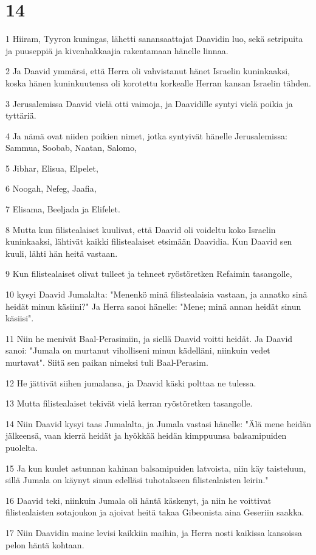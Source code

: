 \chapter{14}

\par 1 Hiiram, Tyyron kuningas, lähetti sanansaattajat Daavidin luo, sekä setripuita ja puuseppiä ja kivenhakkaajia rakentamaan hänelle linnaa.
\par 2 Ja Daavid ymmärsi, että Herra oli vahvistanut hänet Israelin kuninkaaksi, koska hänen kuninkuutensa oli korotettu korkealle Herran kansan Israelin tähden.
\par 3 Jerusalemissa Daavid vielä otti vaimoja, ja Daavidille syntyi vielä poikia ja tyttäriä.
\par 4 Ja nämä ovat niiden poikien nimet, jotka syntyivät hänelle Jerusalemissa: Sammua, Soobab, Naatan, Salomo,
\par 5 Jibhar, Elisua, Elpelet,
\par 6 Noogah, Nefeg, Jaafia,
\par 7 Elisama, Beeljada ja Elifelet.
\par 8 Mutta kun filistealaiset kuulivat, että Daavid oli voideltu koko Israelin kuninkaaksi, lähtivät kaikki filistealaiset etsimään Daavidia. Kun Daavid sen kuuli, lähti hän heitä vastaan.
\par 9 Kun filistealaiset olivat tulleet ja tehneet ryöstöretken Refaimin tasangolle,
\par 10 kysyi Daavid Jumalalta: "Menenkö minä filistealaisia vastaan, ja annatko sinä heidät minun käsiini?" Ja Herra sanoi hänelle: "Mene; minä annan heidät sinun käsiisi".
\par 11 Niin he menivät Baal-Perasimiin, ja siellä Daavid voitti heidät. Ja Daavid sanoi: "Jumala on murtanut viholliseni minun kädelläni, niinkuin vedet murtavat". Siitä sen paikan nimeksi tuli Baal-Perasim.
\par 12 He jättivät siihen jumalansa, ja Daavid käski polttaa ne tulessa.
\par 13 Mutta filistealaiset tekivät vielä kerran ryöstöretken tasangolle.
\par 14 Niin Daavid kysyi taas Jumalalta, ja Jumala vastasi hänelle: "Älä mene heidän jälkeensä, vaan kierrä heidät ja hyökkää heidän kimppuunsa balsamipuiden puolelta.
\par 15 Ja kun kuulet astunnan kahinan balsamipuiden latvoista, niin käy taisteluun, sillä Jumala on käynyt sinun edelläsi tuhotakseen filistealaisten leirin."
\par 16 Daavid teki, niinkuin Jumala oli häntä käskenyt, ja niin he voittivat filistealaisten sotajoukon ja ajoivat heitä takaa Gibeonista aina Geseriin saakka.
\par 17 Niin Daavidin maine levisi kaikkiin maihin, ja Herra nosti kaikissa kansoissa pelon häntä kohtaan.


